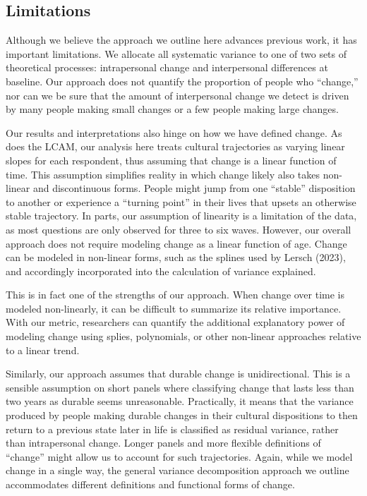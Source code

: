 \documentclass[
  12pt,
]{article}
\begin{document}
\hypertarget{limitations}{%
\subsection{Limitations}\label{limitations}}

Although we believe the approach we outline here advances previous work,
it has important limitations. We allocate all systematic variance to one
of two sets of theoretical processes: intrapersonal change and
interpersonal differences at baseline. Our approach does not quantify
the proportion of people who ``change,'' nor can we be sure that the
amount of interpersonal change we detect is driven by many people making
small changes or a few people making large changes.

Our results and interpretations also hinge on how we have defined
change. As does the LCAM, our analysis here treats cultural trajectories
as varying linear slopes for each respondent, thus assuming that change
is a linear function of time. This assumption simplifies reality in
which change likely also takes non-linear and discontinuous forms.
People might jump from one ``stable'' disposition to another or
experience a ``turning point'' in their lives that upsets an otherwise
stable trajectory. In parts, our assumption of linearity is a limitation
of the data, as most questions are only observed for three to six waves.
However, our overall approach does not require modeling change as a
linear function of age. Change can be modeled in non-linear forms, such
as the splines used by Lersch (2023), and accordingly incorporated into
the calculation of variance explained.

This is in fact one of the strengths of our approach. When change over
time is modeled non-linearly, it can be difficult to summarize its
relative importance. With our metric, researchers can quantify the
additional explanatory power of modeling change using splies,
polynomials, or other non-linear approaches relative to a linear trend.

Similarly, our approach assumes that durable change is unidirectional.
This is a sensible assumption on short panels where classifying change
that lasts less than two years as durable seems unreasonable.
Practically, it means that the variance produced by people making
durable changes in their cultural dispositions to then return to a
previous state later in life is classified as residual variance, rather
than intrapersonal change. Longer panels and more flexible definitions
of ``change'' might allow us to account for such trajectories. Again,
while we model change in a single way, the general variance
decomposition approach we outline accommodates different definitions and
functional forms of change.
\end{document}
